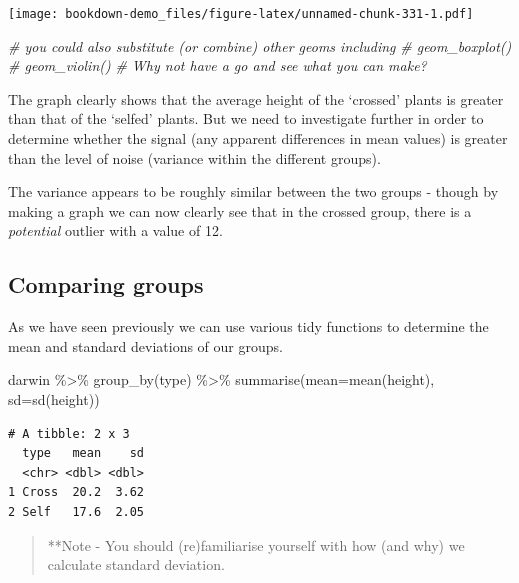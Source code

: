 \documentclass[
]{book}
\newenvironment{Shaded}{\begin{snugshade}}{\end{snugshade}}
\newcommand{\AttributeTok}[1]{\textcolor[rgb]{0.77,0.63,0.00}{#1}}
\newcommand{\CommentTok}[1]{\textcolor[rgb]{0.56,0.35,0.01}{\textit{#1}}}
\newcommand{\FunctionTok}[1]{\textcolor[rgb]{0.00,0.00,0.00}{#1}}
\newcommand{\NormalTok}[1]{#1}
\newcommand{\SpecialCharTok}[1]{\textcolor[rgb]{0.00,0.00,0.00}{#1}}
\begin{document}
\texttt{[image: bookdown-demo\_files/figure-latex/unnamed-chunk-331-1.pdf]}

\begin{Shaded}
\begin{Highlighting}[]
\CommentTok{\# you could also substitute (or combine) other geoms including}
\CommentTok{\# geom\_boxplot()}
\CommentTok{\# geom\_violin()}
\CommentTok{\# Why not have a go and see what you can make?}
\end{Highlighting}
\end{Shaded}

The graph clearly shows that the average height of the `crossed' plants is greater than that of the `selfed' plants. But we need to investigate further in order to determine whether the signal (any apparent differences in mean values) is greater than the level of noise (variance within the different groups).

The variance appears to be roughly similar between the two groups - though by making a graph we can now clearly see that in the crossed group, there is a \emph{potential} outlier with a value of 12.

\hypertarget{comparing-groups}{%
\subsection{Comparing groups}\label{comparing-groups}}

As we have seen previously we can use various tidy functions to determine the mean and standard deviations of our groups.

\begin{Shaded}
\begin{Highlighting}[]
\NormalTok{darwin }\SpecialCharTok{\%\textgreater{}\%} 
  \FunctionTok{group\_by}\NormalTok{(type) }\SpecialCharTok{\%\textgreater{}\%} 
  \FunctionTok{summarise}\NormalTok{(}\AttributeTok{mean=}\FunctionTok{mean}\NormalTok{(height),}
            \AttributeTok{sd=}\FunctionTok{sd}\NormalTok{(height))}
\end{Highlighting}
\end{Shaded}

\begin{verbatim}
# A tibble: 2 x 3
  type   mean    sd
  <chr> <dbl> <dbl>
1 Cross  20.2  3.62
2 Self   17.6  2.05
\end{verbatim}

\begin{quote}
**Note - You should (re)familiarise yourself with how (and why) we calculate standard deviation.
\end{quote}
\end{document}
